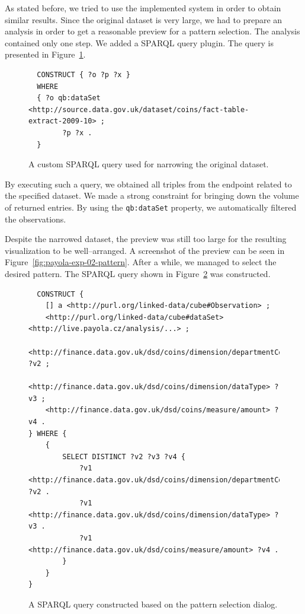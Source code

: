 As stated before, we tried to use the implemented system in order to obtain 
similar results. Since the original dataset is very large, we had to prepare an 
analysis in order to get a reasonable preview for a pattern selection. The 
analysis contained only one step. We added a SPARQL query plugin. The query is presented
in Figure~\ref{fig:coins-query-narrow}.

\begin{figure}
  \scriptsize
\begin{verbatim}
  CONSTRUCT { ?o ?p ?x }
  WHERE
  { ?o qb:dataSet <http://source.data.gov.uk/dataset/coins/fact-table-extract-2009-10> ;
        ?p ?x .
  }
\end{verbatim}
\label{fig:coins-query-narrow}
\caption{A custom SPARQL query used for narrowing the original dataset.}
\end{figure}

By executing such a query, we obtained all triples from the endpoint 
related to the specified dataset. We made a strong constraint for bringing 
down the volume of returned entries. By using the \texttt{qb:dataSet} property, 
we automatically filtered the observations.

Despite the narrowed dataset, the preview was still too large 
for the resulting visualization to be well--arranged. A screenshot of the 
preview can be seen in Figure~\ref{fig:payola-exp-02-pattern}. After a while,
we managed to select the desired 
pattern. The SPARQL query shown in Figure~\ref{fig:coins-pattern-result} was 
constructed.

\begin{figure}
  \scriptsize
\begin{verbatim}
  CONSTRUCT {
    [] a <http://purl.org/linked-data/cube#Observation> ;
    <http://purl.org/linked-data/cube#dataSet> <http://live.payola.cz/analysis/...> ;
    <http://finance.data.gov.uk/dsd/coins/dimension/departmentCode> ?v2 ;
    <http://finance.data.gov.uk/dsd/coins/dimension/dataType> ?v3 ;
    <http://finance.data.gov.uk/dsd/coins/measure/amount> ?v4 .
} WHERE {
    {
        SELECT DISTINCT ?v2 ?v3 ?v4 {
            ?v1 <http://finance.data.gov.uk/dsd/coins/dimension/departmentCode> ?v2 .
            ?v1 <http://finance.data.gov.uk/dsd/coins/dimension/dataType> ?v3 .
            ?v1 <http://finance.data.gov.uk/dsd/coins/measure/amount> ?v4 .
        }
    }
} 
\end{verbatim}
\label{fig:coins-pattern-result}
\caption{A SPARQL query constructed based on the pattern selection dialog.}
\end{figure}

